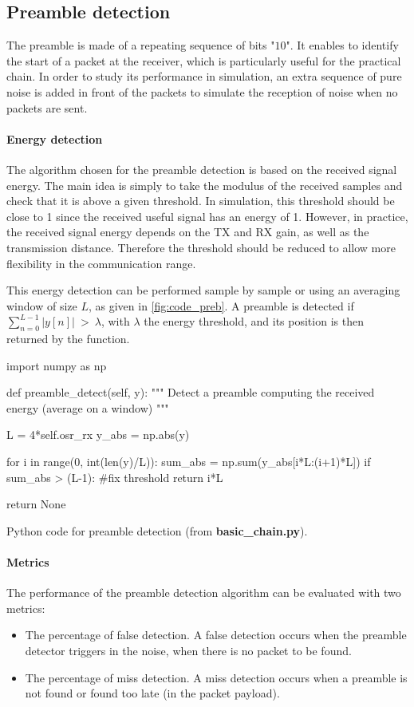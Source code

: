 \subsection{Preamble detection}
The preamble is made of a repeating sequence of bits "$10$". It enables to identify the start of a packet at the receiver, which is particularly useful for the practical chain. In order to study its performance in simulation, an extra sequence of pure noise is added in front of the packets to simulate the reception of noise when no packets are sent.

\paragraph{Energy detection} The algorithm chosen for the preamble detection is based on the received signal energy. The main idea is simply to take the modulus of the received samples and check that it is above a given threshold. In simulation, this threshold should be close to 1 since the received useful signal has an energy of 1. However, in practice, the received signal energy depends on the TX and RX gain, as well as the transmission distance. Therefore the threshold should be reduced to allow more flexibility in the communication range.

This energy detection can be performed sample by sample or using an averaging window of size $L$, as given in \autoref{fig:code_preb}. A preamble is detected if $\sum_{n=0}^{L-1}|y[n]| \: > \: \lambda$,
with $\lambda$ the energy threshold, and its position is then returned by the function.

\begin{listing}[H]
\begin{python}
import numpy as np

def preamble_detect(self, y):
    """
    Detect a preamble computing the received energy (average on a window)
    """

    L = 4*self.osr_rx
    y_abs = np.abs(y)

    for i in range(0, int(len(y)/L)):
        sum_abs = np.sum(y_abs[i*L:(i+1)*L])
        if sum_abs > (L-1): #fix threshold
            return i*L

    return None

\end{python}
\caption{Python code for preamble detection (from \textbf{basic\_chain.py}).}
\label{fig:code_preb}
\end{listing}

\paragraph{Metrics} The performance of the preamble detection algorithm can be evaluated with two metrics:
\begin{itemize}
    \item The percentage of false detection. A false detection occurs when the preamble detector triggers in the noise, when there is no packet to be found.
    \item The percentage of miss detection. A miss detection occurs when a preamble is not found or found too late (in the packet payload).
\end{itemize}

